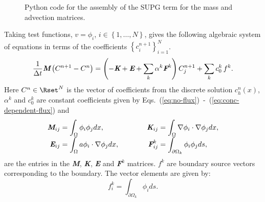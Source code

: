 \begin{figure}
  \centering
  \vspace{-1.5em}
  \caption{Python code for the assembly of the SUPG term for the mass and advection matrices.}
  \label{fig:SUPG-assembly-algorithm}
\end{figure}
Taking test functions, $v=\phi_i$, $i\in\left\{1,\ldots,N\right\}$, gives the following algebraic system of equations in terms of the coefficients $\left\{ c^{n+1}_i\right\}^N_{i=1}$.
\begin{equation}
  \label{eq:algebraic-equation}
  \frac{1}{\Delta{}t}\text{\bfseries\itshape M}\left(C^{n+1}-C^n\right) =  \left(-\text{\bfseries\itshape K}+\text{\bfseries\itshape E}+\sum_k\alpha^k\text{\bfseries\itshape F}^k\right)C_j^{n+1}+\sum_k c_0^k\,f^k.
\end{equation}
Here $C^n\in \Rset^N$ is the vector of coefficients from the discrete solution $c^n_h(x)$, $\alpha^k$ and $c_0^k$ are constant coefficients given by Eqs.~(\ref{eq:no-flux})~-~(\ref{eq:conc-dependent-flux}) and\\[-1.0em]
\begin{equation}
  \renewcommand{\arraystretch}{1.7}
  \renewcommand{\baselinestretch}{1.7}
  \begin{array}{r@{\;=\;}lcr@{\;=\;}l}
    \text{\bfseries\itshape M}_{ij}&\displaystyle\int_\Omega\phi_i\phi_jdx,& \quad\quad&\text{\bfseries\itshape K}_{ij}&\displaystyle\int_\Omega\nabla\phi_i\cdot\nabla\phi_jdx,\\
    \text{\bfseries\itshape E}_{ij}&\displaystyle\int_\Omega a\phi_i\cdot\nabla\phi_jdx,& \quad\quad&\text{\bfseries\itshape F}^k_{ij}&\displaystyle\int_{\partial\Omega_k}\phi_i\phi_jds,
  \end{array}
  \renewcommand{\arraystretch}{1}
  \renewcommand{\baselinestretch}{1}
  \label{eq:matrices}
\end{equation}
are the entries in the {\bfseries\itshape M}, {\bfseries\itshape K}, {\bfseries\itshape E} and {\bfseries\itshape F}$^k$ matrices. $f^k$ are boundary source vectors corresponding to the \kth boundary. The vector elements are given by:
\begin{equation}
  \label{eq:vector}
  f^k_{i}=\int_{\partial\Omega_k}\phi_ids.
\end{equation}

